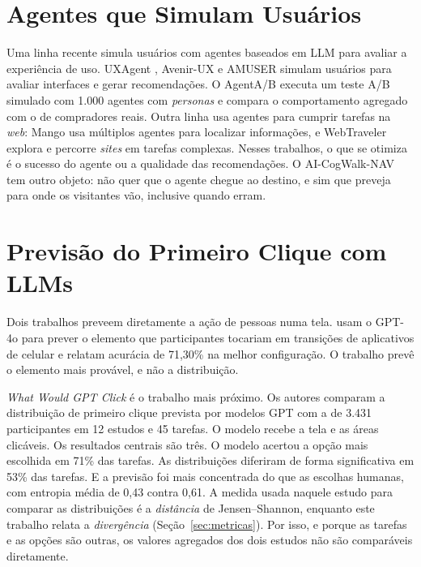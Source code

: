 \documentclass[12pt,oneside,a4paper,chapter=TITLE,english,brazil]{abntex2}
\newcommand{\proj}{AI-CogWalk-NAV}
\begin{document}
\section{Agentes que Simulam Usuários}

Uma linha recente simula usuários com agentes baseados em LLM para avaliar a experiência de uso. UXAgent \cite{lu2025uxagent}, Avenir-UX \cite{tan2026avenirux} e AMUSER \cite{chowdhury2026amuser} simulam usuários para avaliar interfaces e gerar recomendações. O AgentA/B \cite{lu2025agentab} executa um teste A/B simulado com 1.000 agentes com \textit{personas} e compara o comportamento agregado com o de compradores reais. Outra linha usa agentes para cumprir tarefas na \textit{web}: Mango \cite{tong2026mango} usa múltiplos agentes para localizar informações, e WebTraveler \cite{li2026webtraveler} explora e percorre \textit{sites} em tarefas complexas. Nesses trabalhos, o que se otimiza é o sucesso do agente ou a qualidade das recomendações. O \proj{} tem outro objeto: não quer que o agente chegue ao destino, e sim que preveja para onde os visitantes vão, inclusive quando erram.

\section{Previsão do Primeiro Clique com LLMs}
\label{sec:wwgc}

Dois trabalhos preveem diretamente a ação de pessoas numa tela.  usam o GPT-4o para prever o elemento que participantes tocariam em transições de aplicativos de celular e relatam acurácia de 71,30\% na melhor configuração. O trabalho prevê o elemento mais provável, e não a distribuição.

\textit{What Would GPT Click} \cite{kuric2026wwgc} é o trabalho mais próximo. Os autores comparam a distribuição de primeiro clique prevista por modelos GPT com a de 3.431 participantes em 12 estudos e 45 tarefas. O modelo recebe a tela e as áreas clicáveis. Os resultados centrais são três. O modelo acertou a opção mais escolhida em 71\% das tarefas. As distribuições diferiram de forma significativa em 53\% das tarefas. E a previsão foi mais concentrada do que as escolhas humanas, com entropia média de 0,43 contra 0,61. A medida usada naquele estudo para comparar as distribuições é a \emph{distância} de Jensen--Shannon, enquanto este trabalho relata a \emph{divergência} (Seção~\ref{sec:metricas}). Por isso, e porque as tarefas e as opções são outras, os valores agregados dos dois estudos não são comparáveis diretamente.
\end{document}
